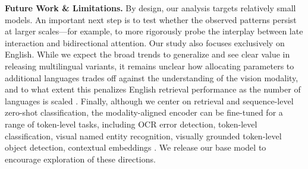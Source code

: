 \noindent\textbf{Future Work \& Limitations.}  
By design, our analysis targets relatively small models. An important next step is to test whether the observed patterns persist at larger scales—for example, to more rigorously probe the interplay between late interaction and bidirectional attention. Our study also focuses exclusively on English. While we expect the broad trends to generalize and see clear value in releasing multilingual variants, it remains unclear how allocating parameters to additional languages trades off against the understanding of the vision modality, and to what extent this penalizes English retrieval performance as the number of languages is scaled . Finally, although we center on retrieval and sequence-level zero-shot classification, the modality-aligned encoder can be fine-tuned for a range of token-level tasks, including OCR error detection, token-level classification, visual named entity recognition, visually grounded token-level object detection, contextual embeddings . We release our base model to encourage exploration of these directions.



